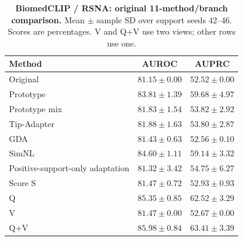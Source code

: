 \begin{table}[tp]
\centering
\caption{\textbf{BiomedCLIP / RSNA: original 11-method/branch comparison.} Mean $\pm$ sample SD over support seeds 42--46. Scores are percentages. V and Q+V use two views; other rows use one.}
\label{tab:supp-oldmeans-biomedclip-rsna_pneumonia}
\small
\setlength{\tabcolsep}{4pt}
\begin{tabular*}{\textwidth}{@{\extracolsep{\fill}}lcc@{}}
\toprule
Method & AUROC & AUPRC \\
\midrule
Original & $81.15\pm0.00$ & $52.52\pm0.00$ \\
Prototype & $83.81\pm1.39$ & $59.68\pm4.97$ \\
Prototype mix & $81.83\pm1.54$ & $53.82\pm2.92$ \\
Tip-Adapter & $81.88\pm1.63$ & $53.80\pm2.87$ \\
GDA & $81.43\pm0.63$ & $52.56\pm0.10$ \\
SimNL & $84.60\pm1.11$ & $59.14\pm3.32$ \\
Positive-support-only adaptation & $81.32\pm3.42$ & $54.75\pm6.27$ \\
Score S & $81.47\pm0.72$ & $52.93\pm0.93$ \\
Q & $85.35\pm0.85$ & $62.52\pm3.29$ \\
V & $81.47\pm0.00$ & $52.67\pm0.00$ \\
Q+V & $85.98\pm0.84$ & $63.41\pm3.39$ \\
\bottomrule
\end{tabular*}
\end{table}
